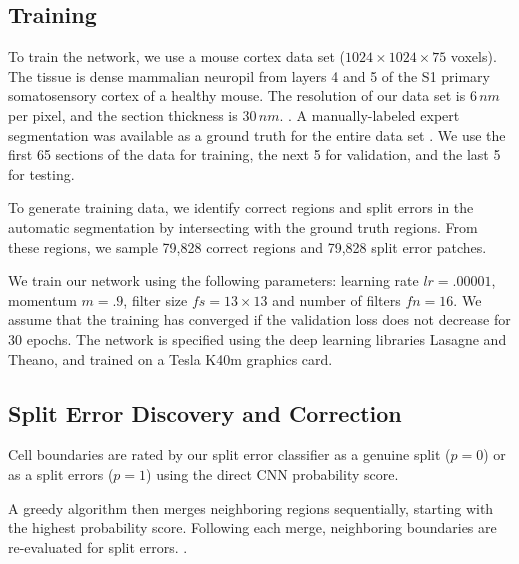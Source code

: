 \subsection{Training}
To train the network, we use a mouse cortex data set ($1024\times1024\times75$ voxels). The tissue is dense mammalian neuropil from layers 4 and 5 of the S1 primary somatosensory cortex of a healthy mouse. The resolution of our data set is $6\, nm$ per pixel, and the section thickness is $30\, nm$. . A manually-labeled expert segmentation was available as a ground truth for the entire data set . We use the first 65 sections of the data for training, the next 5 for validation, and the last 5 for testing.
%

To generate training data, we identify correct regions and split errors in the automatic segmentation by intersecting with the ground truth regions. From these regions, we sample 79,828 correct regions and 79,828 split error patches.

We train our network using the following parameters: learning rate $lr=.00001$, momentum $m=.9$, filter size $fs=13\times13$ and number of filters $fn=16$. We assume that the training has converged if the validation loss does not decrease for 30 epochs. The network is specified using the deep learning libraries Lasagne and Theano, and trained on a Tesla K40m graphics card. 


\subsection{Split Error Discovery and Correction}

Cell boundaries are rated by our split error classifier as a genuine split ($p=0$) or as a split errors ($p=1$) using the direct CNN probability score. 

A greedy algorithm then merges neighboring regions sequentially, starting with the highest probability score. Following each merge, neighboring boundaries are re-evaluated for split errors. .



